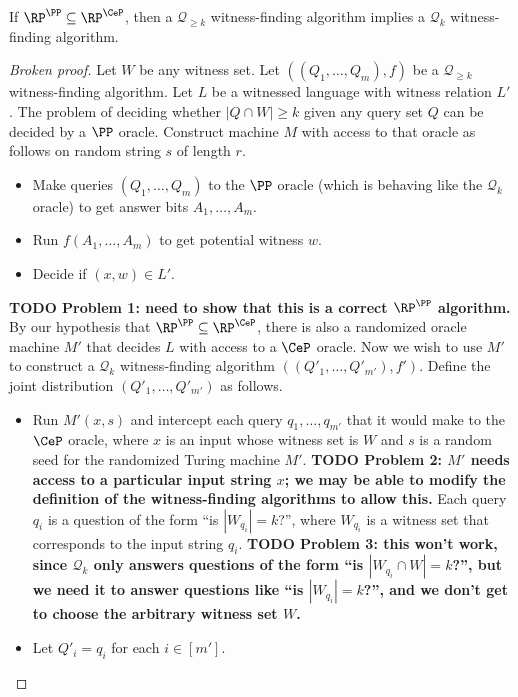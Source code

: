 \documentclass{article}
\newcommand{\todo}[1]{\textbf{TODO #1}}
\newcommand{\mc}{\mathcal}
\begin{document}
\begin{conjecture}
  If $\RP^\PP \subseteq \RP^{\CeP}$, then a $\mc{Q}_{\geq k}$ witness-finding algorithm implies a $\mc{Q}_k$ witness-finding algorithm.
\end{conjecture}
\begin{proof}[Broken proof]
  Let $W$ be any witness set.
  Let $((Q_1, \dotsc, Q_m), f)$ be a $\mc{Q}_{\geq k}$ witness-finding algorithm.
  Let $L$ be a witnessed language with witness relation $L'$.
  The problem of deciding whether $|Q \cap W| \geq k$ given any query set $Q$ can be decided by a $\PP$ oracle.
  Construct machine $M$ with access to that oracle as follows on random string $s$ of length $r$.
  \begin{itemize}
  \item Make queries $(Q_1, \dotsc, Q_m)$ to the $\PP$ oracle (which is behaving like the $\mc{Q}_k$ oracle) to get answer bits $A_1, \dotsc, A_m$.
  \item Run $f(A_1, \dotsc, A_m)$ to get potential witness $w$.
  \item Decide if $(x, w) \in L'$.
  \end{itemize}
  \todo{Problem 1: need to show that this is a correct $\RP^\PP$ algorithm.}
  By our hypothesis that $\RP^\PP \subseteq \RP^{\CeP}$, there is also a randomized oracle machine $M'$ that decides $L$ with access to a $\CeP$ oracle.
  Now we wish to use $M'$ to construct a $\mc{Q}_k$ witness-finding algorithm $((Q'_1, \dotsc, Q'_{m'}), f')$.
  Define the joint distribution $(Q'_1, \dotsc, Q'_{m'})$ as follows.
  \begin{itemize}
  \item Run $M'(x, s)$ and intercept each query $q_1, \dotsc, q_{m'}$ that it would make to the $\CeP$ oracle, where $x$ is an input whose witness set is $W$ and $s$ is a random seed for the randomized Turing machine $M'$.
    \todo{Problem 2: $M'$ needs access to a particular input string $x$; we may be able to modify the definition of the witness-finding algorithms to allow this.}
    Each query $q_i$ is a question of the form ``is $|W_{q_i}| = k$?'', where $W_{q_i}$ is a witness set that corresponds to the input string $q_i$.
    \todo{Problem 3: this won't work, since $\mc{Q}_k$ only answers questions of the form ``is $|W_{q_i} \cap W| = k$?'', but we need it to answer questions like ``is $|W_{q_i}| = k$?'', and we don't get to choose the arbitrary witness set $W$.}
  \item Let $Q'_i = q_i$ for each $i \in [m']$.
  \end{itemize}

\end{proof}
\end{document}
